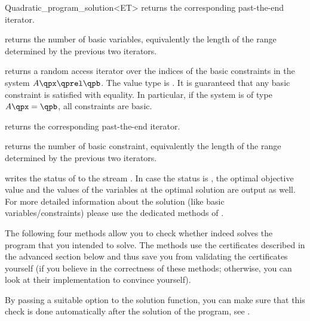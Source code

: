 \begin{ccRefClass}{Quadratic_program_solution<ET>}
{returns the corresponding past-the-end iterator.}

{returns the number of basic variables, equivalently the length
of the range determined by the previous two iterators.}

\ccExample
{}

{returns a random access iterator over the indices of the basic
constraints in the system $A\qpx\qprel \qpb$. The value type is . 
It is guaranteed that any basic constraint is satisfied with equality.
In particular, if the system is of type $A\qpx=\qpb$, all constraints are
basic.}

{returns the corresponding past-the-end iterator.}

{returns the number of basic constraint, equivalently the length
of the range determined by the previous two iterators.}

\ccExample
{}


{writes the status of  to the stream . In case the
status is , the optimal objective value and the values
of the variables at the optimal solution are output as well. For more
detailed information about the solution (like basic variables/constraints) 
please use the dedicated methods of .}

The following four methods allow you to check whether  indeed
solves the program that you intended to solve. The methods 
use the certificates described in the advanced section below and
thus save you from validating the certificates yourself (if you believe 
in the correctness of these methods; otherwise, you can look at their
implementation to convince yourself). 

By passing a suitable option to the solution function, you can make sure that 
this check is done automatically after the solution of the program, see 
.


\end{ccRefClass}
